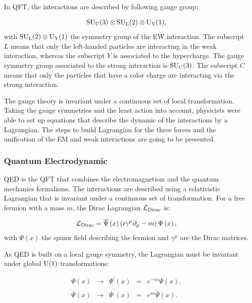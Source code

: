     In \gls{QFT}, the interactions are described by following gauge group:
    
      \begin{equation}
        \rm{SU}_{\rm{C}}(3) \otimes \rm{SU}_{\rm{L}}(2) \otimes \rm{U}_{\rm{Y}}(1),
      \end{equation}
    with $\rm{SU}_{\rm{L}}(2) \otimes \rm{U}_{\rm{Y}}(1)$ the symmetry group of the \gls{EW} interaction. 
    The subscript $L$ means that only the left-handed particles are interacting in the weak interaction, whereas the subscript $Y$ is associated to the hypercharge.
    The gauge symmetry group associated to the strong interaction is $\rm{SU}_{\rm{C}}(3)$.
    The subscript $C$ means that only the particles that have a color charge are interacting via the strong interaction.

    The gauge theory is invariant under a continuous set of local transformation.
    Taking the gauge symmetries and the least action into account, physicists were able to set up equations that describe the dynamic of the interactions by a Lagrangian.
    The steps to build Lagrangian for the three forces and the unification of the \gls{EM} and weak interactions are going to be presented. 

      \subsubsection{Quantum Electrodynamic}
      
      \gls{QED} is the \gls{QFT} that combines the electromagnetism and the quantum mechanics formalisms.
      The interactions are described using a relativistic Lagrangian that is invariant under a continuous set of transformation.
      For a free fermion with a mass $m$, the Dirac Lagrangian $\mathcal{L}_{\rm{Dirac}}$ is:

      \begin{equation}
        \mathcal{L}_{\rm{Dirac}} = \overline{\Psi}\left(x\right) \left(i \gamma^{\mu}\partial_{\mu} - m \right) \Psi\left(x\right),
        \label{eq:diracLag}
      \end{equation}
      with $\Psi\left(x\right)$ the spinor field describing the fermion and $\gamma^{\mu}$ are the Dirac matrices. 
      
      As \gls{QED} is built on a local gauge symmetry, the Lagrangian must be invariant under global $\rm{U}(1)$ transformations:
      
      \begin{equation}
            \begin{array}{rrccr}
             \Psi \left(x \right) & \rightarrow & \Psi^{'} \left(x \right)  & = & e^{-i\alpha} \Psi\left(x\right), \\
             \overline{\Psi}\left(x\right) & \rightarrow & \overline{\Psi}^{'}\left(x\right) & = & e^{i\alpha}  \overline{\Psi}\left(x\right). \\
            \end{array}
        \label{eq:globalTransformations}
      \end{equation}

